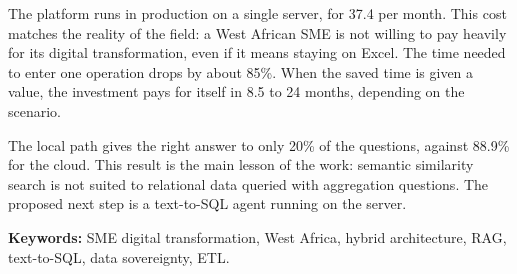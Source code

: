The platform runs in production on a single server, for \texteuro{}37.4 per month. This cost matches the reality of the field: a West African SME is not willing to pay heavily for its digital transformation, even if it means staying on Excel. The time needed to enter one operation drops by about 85\%. When the saved time is given a value, the investment pays for itself in 8.5 to 24 months, depending on the scenario.

The local path gives the right answer to only 20\% of the questions, against 88.9\% for the cloud. This result is the main lesson of the work: semantic similarity search is not suited to relational data queried with aggregation questions. The proposed next step is a text-to-SQL agent running on the server.

\medskip
\noindent\textbf{Keywords:} SME digital transformation, West Africa, hybrid architecture, RAG, text-to-SQL, data sovereignty, ETL.
